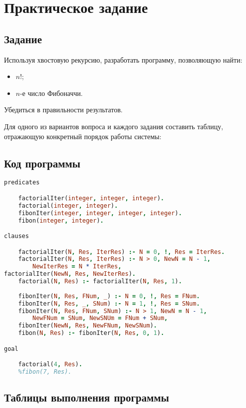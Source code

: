 \documentclass[14pt,a4paper]{scrreprt}
\begin{document}


\thispagestyle{empty}

\chapter{Практическое задание}

\section{Задание}

Используя хвостовую рекурсию, разработать программу, позволяющую найти:
\begin{itemize}
	\item $n!$;
	\item $n$-е число Фибоначчи.
\end{itemize}
Убедиться в правильности результатов.

Для одного из вариантов вопроса и каждого задания составить таблицу, отражающую конкретный порядок работы системы:

\section{Код программы}

\begin{lstlisting}[language=Prolog]
predicates

	factorialIter(integer, integer, integer).
	factorial(integer, integer).
	fibonIter(integer, integer, integer, integer).
	fibon(integer, integer).

clauses

	factorialIter(N, Res, IterRes) :- N = 0, !, Res = IterRes.
	factorialIter(N, Res, IterRes) :- N > 0, NewN = N - 1, 
		NewIterRes = N * IterRes,
factorialIter(NewN, Res, NewIterRes). 
	factorial(N, Res) :- factorialIter(N, Res, 1).
	
	fibonIter(N, Res, FNum, _) :- N = 0, !, Res = FNum.
	fibonIter(N, Res, _, SNum) :- N = 1, !, Res = SNum.
	fibonIter(N, Res, FNum, SNum) :- N > 1, NewN = N - 1, 
		NewFNum = SNum, NewSNUm = FNum + SNum, 
	fibonIter(NewN, Res, NewFNum, NewSNum).
	fibon(N, Res) :- fibonIter(N, Res, 0, 1).

goal

	factorial(4, Res).
	%fibon(7, Res).
\end{lstlisting}

\section{Таблицы выполнения программы}
\end{document}

